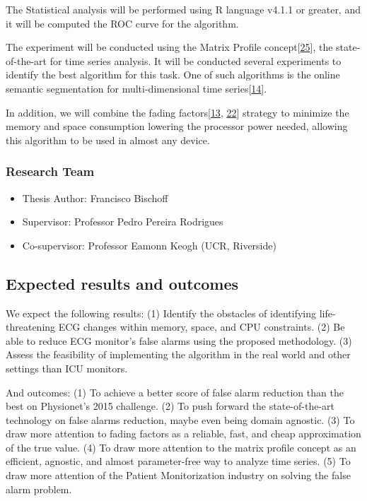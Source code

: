 \documentclass[runningheads]{llncs}
\providecommand{\tightlist}{%
  \setlength{\itemsep}{0pt}\setlength{\parskip}{0pt}}
\begin{document}
The Statistical analysis will be performed using R language v4.1.1 or
greater, and it will be computed the ROC curve for the algorithm.

The experiment will be conducted using the Matrix Profile
concept{[}\protect\hyperlink{ref-yeh2016}{25}{]}, the state-of-the-art
for time series analysis. It will be conducted several experiments to
identify the best algorithm for this task. One of such algorithms is the
online semantic segmentation for multi-dimensional time
series{[}\protect\hyperlink{ref-gharghabi2018}{14}{]}.

In addition, we will combine the fading
factors{[}\protect\hyperlink{ref-Gama2013}{13},
\protect\hyperlink{ref-Rodrigues2010}{22}{]} strategy to minimize the
memory and space consumption lowering the processor power needed,
allowing this algorithm to be used in almost any device.

\hypertarget{research-team}{%
\subsubsection{Research Team}\label{research-team}}

\begin{itemize}
\tightlist
\item
  Thesis Author: Francisco Bischoff
\item
  Supervisor: Professor Pedro Pereira Rodrigues
\item
  Co-supervisor: Professor Eamonn Keogh (UCR, Riverside)
\end{itemize}

\hypertarget{expected-results-and-outcomes}{%
\subsection{Expected results and
outcomes}\label{expected-results-and-outcomes}}

We expect the following results: (1) Identify the obstacles of
identifying life-threatening ECG changes within memory, space, and CPU
constraints. (2) Be able to reduce ECG monitor's false alarms using the
proposed methodology. (3) Assess the feasibility of implementing the
algorithm in the real world and other settings than ICU monitors.

And outcomes: (1) To achieve a better score of false alarm reduction
than the best on Physionet's 2015 challenge. (2) To push forward the
state-of-the-art technology on false alarms reduction, maybe even being
domain agnostic. (3) To draw more attention to fading factors as a
reliable, fast, and cheap approximation of the true value. (4) To draw
more attention to the matrix profile concept as an efficient, agnostic,
and almost parameter-free way to analyze time series. (5) To draw more
attention of the Patient Monitorization industry on solving the false
alarm problem.
\end{document}
